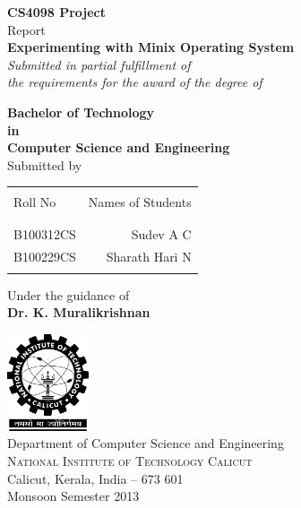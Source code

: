 \begin{titlepage}

\begin{center}

\textup{\small {\bf CS4098 Project} \\ Report}\\[0.2in]

\Large \textbf {Experimenting with Minix Operating System}\\[0.5in]

       \small \emph{Submitted in partial fulfillment of\\
        the requirements for the award of the degree of}
        \vspace{.2in}

       {\bf Bachelor of Technology \\in\\ Computer Science and Engineering}\\[0.5in]

\normalsize Submitted by \\
\begin{table}[h]
\centering
\begin{tabular}{lr}\hline \\
Roll No & Names of Students \\ \\ \hline
\\
B100312CS & Sudev A C \\
B100229CS & Sharath Hari N \\ 
 \\ \hline 
\end{tabular}
\end{table}

\vspace{.1in}
Under the guidance of\\
{\textbf{Dr. K. Muralikrishnan}}\\[0.2in]

\vfill

\includegraphics[width=0.18\textwidth]{./nitc-logo}\\[0.1in]
\Large{Department of Computer Science and Engineering}\\
\normalsize
\textsc{National Institute of Technology Calicut}\\
Calicut, Kerala, India -- 673 601 \\
\vspace{0.2cm}
Monsoon Semester 2013

\end{center}

\end{titlepage}
